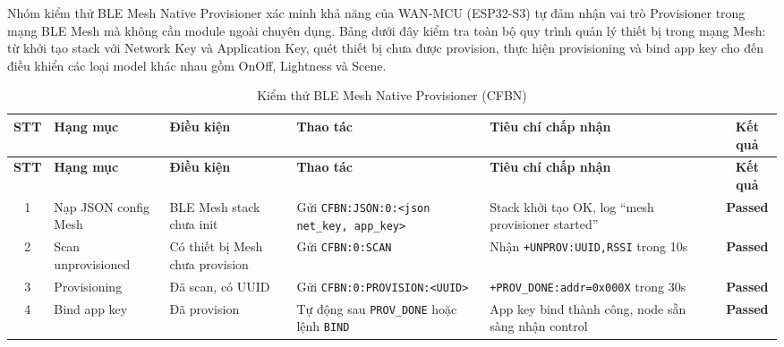         Nhóm kiểm thử BLE Mesh Native Provisioner xác minh khả năng của WAN-MCU (ESP32-S3) tự đảm nhận vai trò Provisioner trong mạng BLE Mesh mà không cần module ngoài chuyên dụng. Bảng dưới đây kiểm tra toàn bộ quy trình quản lý thiết bị trong mạng Mesh: từ khởi tạo stack với Network Key và Application Key, quét thiết bị chưa được provision, thực hiện provisioning và bind app key cho đến điều khiển các loại model khác nhau gồm OnOff, Lightness và Scene.

        \begin{longtable}{|c|p{2cm}|p{2cm}|p{4cm}|p{4cm}|c|}
            \caption{Kiểm thử BLE Mesh Native Provisioner (CFBN)}
            \label{tab:test_ble_mesh_native} \\
            \hline
            \textbf{STT} & \textbf{Hạng mục} & \textbf{Điều kiện} & \textbf{Thao tác} & \textbf{Tiêu chí chấp nhận} & \textbf{Kết quả} \\ \hline
            \endfirsthead
            \hline
            \textbf{STT} & \textbf{Hạng mục} & \textbf{Điều kiện} & \textbf{Thao tác} & \textbf{Tiêu chí chấp nhận} & \textbf{Kết quả} \\ \hline
            \endhead
            \hline
            \endfoot
            \endlastfoot

            1 & Nạp JSON config Mesh & BLE Mesh stack chưa init & Gửi \texttt{CFBN:JSON:0:}\newline\texttt{<json net\_key, app\_key>} & Stack khởi tạo OK, log ``mesh provisioner started'' & \textcolor{modern_blue}{\textbf{Passed}} \\ \hline

            2 & Scan unprovisioned & Có thiết bị Mesh chưa provision & Gửi \texttt{CFBN:0:SCAN} & Nhận \texttt{+UNPROV:}\newline\texttt{UUID,RSSI} trong 10s & \textcolor{modern_blue}{\textbf{Passed}} \\ \hline

            3 & Provisioning & Đã scan, có UUID & Gửi \texttt{CFBN:0:}\newline\texttt{PROVISION:<UUID>} & \texttt{+PROV\_DONE:}\newline\texttt{addr=0x000X} trong 30s & \textcolor{modern_blue}{\textbf{Passed}} \\ \hline

            4 & Bind app key & Đã provision & Tự động sau \texttt{PROV\_DONE} hoặc lệnh \texttt{BIND} & App key bind thành công, node sẵn sàng nhận control & \textcolor{modern_blue}{\textbf{Passed}} \\ \hline


\end{longtable}
